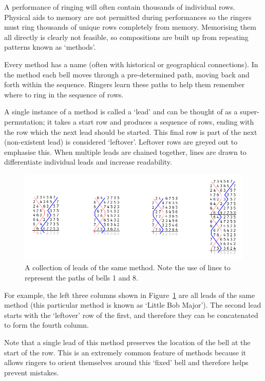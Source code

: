\documentclass[12pt]{article}
\begin{document}
A performance of ringing will often contain thousands of individual rows.  Physical aids to memory
are not permitted during performances so the ringers must ring thousands of unique rows completely
from memory.  Memorising them all directly is clearly not feasible, so compositions are built up
from repeating patterns known as `methods'.

Every method has a name (often with historical or geographical connections). In the method each bell
moves through a pre-determined path, moving back and forth within the sequence. Ringers learn these
paths to help them remember where to ring in the sequence of rows.

A single instance of a method is called a `lead' and can be thought of as a super-permutation; it
takes a start row and produces a sequence of rows, ending with the row which the next lead should be
started.  This final row is part of the next (non-existent lead) is considered `leftover'.  Leftover
rows are greyed out to emphasise this.  When multiple leads are chained together, lines are drawn to
differentiate individual leads and increase readability.

\begin{figure}[h!]
    \includegraphics[width=\textwidth]{lb8}
    \caption{A collection of leads of the same method.  Note the use of lines to represent the
    paths of bells 1 and 8.}\label{fig:little-bob}
\end{figure}

For example, the left three columns shown in Figure~\ref{fig:little-bob} are all leads of the same
method (this particular method is known as `Little Bob Major').  The second lead starts with the
`leftover' row of the first, and therefore they can be concatenated to form the fourth column.

Note that a single lead of this method preserves the location of the bell at the start of the
row.  This is an extremely common feature of methods because it allows ringers to orient
themselves around this `fixed' bell and therefore helps prevent mistakes.
\end{document}
